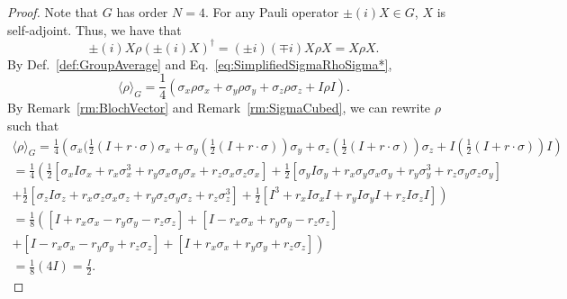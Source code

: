 \begin{proof}\leanok
Note that $G$ has order $N = 4$.
For any Pauli operator $\pm (i) X \in G$, $X$ is self-adjoint.
Thus, we have that
\begin{equation}
    \pm (i) X \rho (\pm (i) X)^{\dagger} = (\pm i) (\mp i) X \rho X = X \rho X.
    \label{eq:SimplifiedSigmaRhoSigma*}
\end{equation}
By Def.~\ref{def:GroupAverage} and Eq.~\ref{eq:SimplifiedSigmaRhoSigma*},
\begin{equation}
    \langle \rho \rangle_{G} = \frac{1}{4} \left( \sigma_{x} \rho \sigma_{x} + \sigma_{y} \rho \sigma_{y} + \sigma_{z} \rho \sigma_{z} + I \rho I \right).
\end{equation}
By Remark~\ref{rm:BlochVector} and Remark~\ref{rm:SigmaCubed}, we can rewrite $\rho$ such that
\begin{equation}
    \begin{split}
        \langle \rho \rangle_{G} = \frac{1}{4} \left( \sigma_{x} (\frac{1}{2} (I + r \cdot \sigma) \sigma_{x} + \sigma_{y} (\frac{1}{2} (I + r \cdot \sigma)) \sigma_{y} + \sigma_{z} (\frac{1}{2} (I + r \cdot \sigma)) \sigma_{z} + I (\frac{1}{2} (I + r \cdot \sigma)) I \right)\\
        = \frac{1}{4} \left( \frac{1}{2} \left[ \sigma_x I \sigma_x + r_x \sigma_x^3 + r_y \sigma_x \sigma_y \sigma_x + r_z \sigma_x \sigma_z \sigma_x \right]
        + \frac{1}{2} \left[ \sigma_y I \sigma_y + r_x \sigma_y \sigma_x \sigma_y + r_y \sigma_y^3 + r_z \sigma_y \sigma_z \sigma_y \right]
        \right.\\
        + \frac{1}{2} \left[ \sigma_z I \sigma_z + r_x \sigma_z \sigma_x \sigma_z + r_y \sigma_z \sigma_y \sigma_z + r_z \sigma_z^3 \right]
        + \frac{1}{2} \left[ I^3 + r_x I \sigma_x I + r_y I \sigma_y I + r_z I \sigma_z I \right]
        \left. \right)\\
        = \frac{1}{8} \left( \right. [I + r_x \sigma_x - r_y \sigma_y - r_z \sigma_z]
        + [I - r_x \sigma_x + r_y \sigma_y - r_z \sigma_z]\\
        + [I - r_x \sigma_x - r_y \sigma_y + r_z \sigma_z]
        + [I + r_x \sigma_x + r_y \sigma_y + r_z \sigma_z ]\left. \right)\\
        = \frac{1}{8}\left( 4I\right) = \frac{I}{2}.
    \end{split}
\end{equation}
\end{proof}
